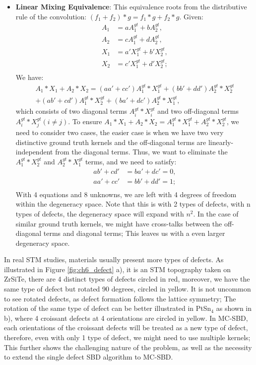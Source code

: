 \begin{itemize}
	\item \textbf{Linear Mixing Equivalence}: This equivalence roots from the distributive rule of the convolution: $(f_1+f_2)*g = f_1*g + f_2*g$. Given: 
	\begin{align*}
		A_1 &= aA_1^{gt}+bA_2^{gt}, \\
		A_2 &= cA_1^{gt}+dA_2^{gt}, \\
		X_1 &= a'X_1^{gt}+b'X_2^{gt}, \\
		X_2 &= c'X_1^{gt}+d'X_2^{gt}; \\
	\end{align*}
	We have: 
	\begin{align*}
		A_1*X_1 +A_2*X_2= (aa'+cc') A_1^{gt}*X_1^{gt}+ (bb'+dd')A_2^{gt}*X_2^{gt} \\+ (ab'+cd') A_1^{gt}*X_2^{gt} +(ba'+dc') A_2^{gt}*X_1^{gt},
	\end{align*}
	which consists of two diagonal terms $A_i^{gt}*X_i^{gt}$ and two off-diagonal terms $A_i^{gt}*X_j^{gt} (i \neq j)$. To ensure $A_1*X_1 +A_2*X_2 = A_1^{gt}*X_1^{gt} + A_2^{gt}*X_2^{gt}$, we need to consider two cases, the easier case is when we have two very distinctive ground truth kernels and the off-diagonal terms are linearly-independent from the diagonal terms. Thus, we want to eliminate the $A_1^{gt}*X_2^{gt}$ and $A_2^{gt}*X_1^{gt}$ terms, and we need to satisfy:
	 \begin{align*}
	 	ab'+cd'&= ba' + dc' = 0, \\
	 	aa'+cc'&= bb' + dd' = 1; \\
	 \end{align*}
	 With 4 equations and 8 unknowns, we are left with 4 degrees of freedom within the degeneracy space. Note that this is with 2 types of defects, with n types of defects, the degeneracy space will expand with $n^2$. In the case of similar ground truth kernels, we might have cross-talks between the off-diagonal terms and diagonal terms; This leaves us with a even larger degeneracy space. 
\end{itemize}

In real STM studies, materials usually present more types of defects. As illustrated in Figure \ref{fig:ch6_defect} a), it is an STM topography taken on ZrSiTe, there are 4 distinct types of defects circled in red, moreover, we have the same type of defect but rotated 90 degrees, circled in yellow. It is not uncommon to see rotated defects, as defect formation follows the lattice symmetry; The rotation of the same type of defect can be better illustrated in PtSn$_4$ as shown in b), where 4 croissant defects at 4 orientations are circled in yellow. In \ac{MC-SBD}, each orientations of the croissant defects will be treated as a new type of defect, therefore, even with only 1 type of defect, we might need to use multiple kernels; This further shows the challenging nature of the problem, as well as the necessity to extend the single defect \ac{SBD} algorithm to \ac{MC-SBD}.
